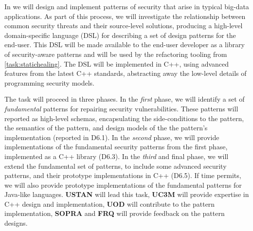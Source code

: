 \begin{Workpackage}{\thewpno}
\begin{Task}
%
%
\end{Task}

\begin{Task}
	\TaskResults{%
	}
	\TaskHeader{}
	
In \theTask{} we will design and implement patterns of security that arise in typical big-data applications. As part of this process, we will investigate the relationship between common security threats and their source-level solutions, producing a high-level domain-specific language (DSL) for describing a set of design patterns for the end-user. This DSL will be made available to the end-user developer as a library of security-aware patterns and will be used by the refactoring tooling from \ref{task:statichealing}. The DSL will be implemented in C++, using advanced features from the latest C++ standards, abstracting away the low-level details of programming security models.

The task will proceed in three phases. In the \emph{first} phase, we will identify a set of \emph{fundamental} patterns for repairing security vulnerabilities. These patterns will reported as high-level schemas, encapsulating the side-conditions to the pattern, the semantics of the pattern, and design models of the the pattern's implementation (reported in D6.1).
In the \emph{second} phase, we will provide implementations of the fundamental security patterns from the first phase, implemented as a C++ library (D6.3). In the \emph{third} and final phase, we will extend the fundamental set of patterns, to include some advanced security patterns, and their prototype implementations in C++ (D6.5). If time permits, we will also provide prototype implementations of the fundamental patterns for Java-like languages. \textbf{USTAN} will lead this task, \textbf{UC3M} will provide expertise in C++ design and implementation, \textbf{UOD} will contribute to the pattern implementation, \textbf{SOPRA} and \textbf{FRQ} will provide feedback on the pattern designs.
\end{Task}


\end{Workpackage}
